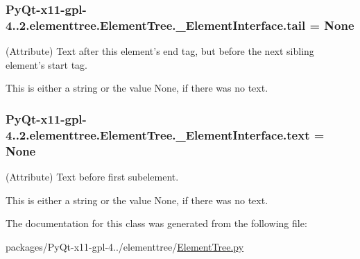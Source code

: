 \subsubsection[{tail}]{\setlength{\rightskip}{0pt plus 5cm}Py\+Qt-\/x11-\/gpl-\/4..\+2.elementtree.\+Element\+Tree.\+\_\+\+Element\+Interface.\+tail = None\hspace{0.3cm}{\ttfamily [static]}}\label{classPyQt-x11-gpl-4_811_82_1_1elementtree_1_1ElementTree_1_1__ElementInterface_a4b21c817f69f1ac09402c88eef377f09}


(Attribute) Text after this element's end tag, but before the next sibling element's start tag. 

This is either a string or the value None, if there was no text. \hypertarget{classPyQt-x11-gpl-4_811_82_1_1elementtree_1_1ElementTree_1_1__ElementInterface_ae7b8e2334e0aeb55cc77ba20c4a0f329}{}
\subsubsection[{text}]{\setlength{\rightskip}{0pt plus 5cm}Py\+Qt-\/x11-\/gpl-\/4..\+2.elementtree.\+Element\+Tree.\+\_\+\+Element\+Interface.\+text = None\hspace{0.3cm}{\ttfamily [static]}}\label{classPyQt-x11-gpl-4_811_82_1_1elementtree_1_1ElementTree_1_1__ElementInterface_ae7b8e2334e0aeb55cc77ba20c4a0f329}


(Attribute) Text before first subelement. 

This is either a string or the value None, if there was no text. 

The documentation for this class was generated from the following file\+:\begin{DoxyCompactItemize}
\item 
packages/\+Py\+Qt-\/x11-\/gpl-\/4../elementtree/\hyperlink{ElementTree_8py}{Element\+Tree.\+py}\end{DoxyCompactItemize}
